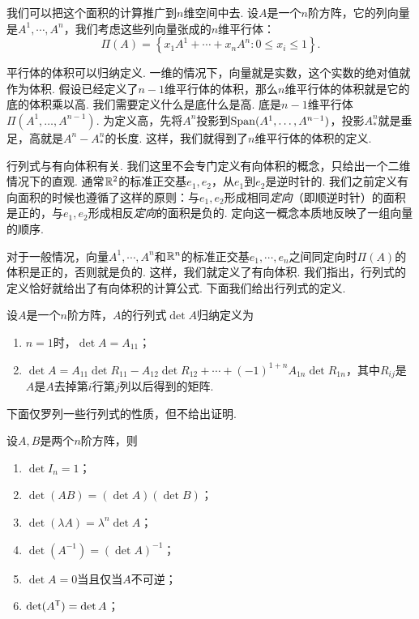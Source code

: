 我们可以把这个面积的计算推广到$n$维空间中去. 设$A$是一个$n$阶方阵，它的列向量是$A^1,\cdots,A^n$，我们考虑这些列向量张成的$n$维平行体：
\[\Pi(A)=\left\{x_1A^1+\cdots+x_nA^n:0\leq x_i\leq 1\right\}.\]

平行体的体积可以归纳定义. 一维的情况下，向量就是实数，这个实数的绝对值就作为体积. 假设已经定义了$n-1$维平行体的体积，那么$n$维平行体的体积就是它的底的体积乘以高. 我们需要定义什么是底什么是高. 底是$n-1$维平行体$\Pi(A^1,\dots,A^{n-1})$. 为定义高，先将$A^n$投影到$\operatorname*{Span}(A^1,\dots,A^{n-1})$，投影$A^n_*$就是垂足，高就是$A^n-A^n_*$的长度. 这样，我们就得到了$n$维平行体的体积的定义. 

行列式与有向体积有关. 我们这里不会专门定义有向体积的概念，只给出一个二维情况下的直观. 通常$\mathbb{R}^2$的标准正交基$e_1,e_2$，从$e_1$到$e_2$是逆时针的. 我们之前定义有向面积的时候也遵循了这样的原则：与$e_1,e_2$形成相同\emph{定向}（即顺逆时针）的面积是正的，与$e_1,e_2$形成相反\emph{定向}的面积是负的. 定向这一概念本质地反映了一组向量的顺序. 

对于一般情况，向量$A^1,\cdots,A^n$和$\mathbb{R}^n$的标准正交基$e_1,\cdots,e_n$之间同定向时$\Pi(A)$的体积是正的，否则就是负的. 这样，我们就定义了有向体积. 我们指出，行列式的定义恰好就给出了有向体积的计算公式. 下面我们给出行列式的定义. 

\begin{definition}[行列式]
    设$A$是一个$n$阶方阵，$A$的行列式$\det A$归纳定义为
\begin{enumerate}
    \item $n=1$时，$\det A=A_{11}$；
    \item $\det A=A_{11}\det R_{11}-A_{12}\det R_{12}+\cdots+(-1)^{1+n}A_{1n}\det R_{1n}$，其中$R_{ij}$是$A$是$A$去掉第$i$行第$j$列以后得到的矩阵. 
\end{enumerate}
\end{definition}

下面仅罗列一些行列式的性质，但不给出证明. 

\begin{proposition}\label{prop:determinant}
    设$A,B$是两个$n$阶方阵，则
    \begin{enumerate}
        \item $\det I_n=1$；
        \item $\det(AB)=(\det A)(\det B)$；
        \item $\det(\lambda A)=\lambda^n\det A$；
        \item $\det(A^{-1})=(\det A)^{-1}$；
        \item $\det A=0$当且仅当$A$不可逆；
        \item $\det(A^{\mathsf{T}})=\det A$；
    \end{enumerate}
\end{proposition}

